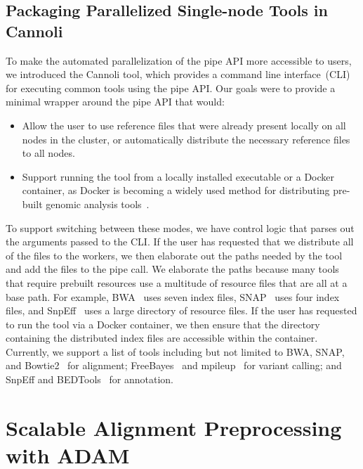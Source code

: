 \documentclass[phd]{ucbthesis}
\begin{document}
\section{Packaging Parallelized Single-node Tools in {Cannoli}}
\label{sec:parallelizing-in-cannoli}

To make the automated parallelization of the {pipe} API more accessible
to users, we introduced the {Cannoli} tool, which provides a command line
interface~(CLI) for executing common tools using the {pipe} API. Our
goals were to provide a minimal wrapper around the {pipe} API that would:

\begin{itemize}
\item Allow the user to use reference files that were already present locally on
  all nodes in the cluster, or automatically distribute the necessary reference
  files to all nodes.
\item Support running the tool from a locally installed executable or a
  {Docker} container, as {Docker} is becoming a widely used method
  for distributing pre-built genomic analysis tools~\cite{vivian17}.
\end{itemize}

To support switching between these modes, we have control logic that parses out the arguments passed to
the CLI. If the user has requested that we distribute all of the files to the
workers, we then elaborate out the paths needed by the tool and add the files
to the {pipe} call. We elaborate the paths because many tools that require prebuilt
resources use a multitude of resource files that are all at a base path. For
example, BWA~\cite{li09bwa} uses seven index files, SNAP~\cite{zaharia11} uses
four index files, and {SnpEff}~\cite{cingolani12} uses a large directory of
resource files. If the user has requested to run the tool via a {Docker}
container, we then ensure that the directory containing the distributed
index files are accessible within the container. Currently, we support a list of
tools including but not limited to BWA, SNAP, and
{Bowtie2}~\cite{langmead09bowtie} for alignment;
{FreeBayes}~\cite{garrison12} and {mpileup}~\cite{li11} for
variant calling; and {SnpEff} and {BEDTools}~\cite{quinlan10} for
annotation.

\chapter{Scalable Alignment Preprocessing with {ADAM}}
\label{chap:adam}
\end{document}
